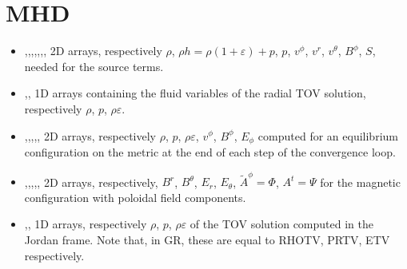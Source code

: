\documentclass[letterpaper,10pt,english]{sphinxmanual}
\begin{document}
\section{MHD}
\label{\detokenize{arrays:mhd}}\begin{itemize}
\item {} 
\sphinxAtStartPar
{},,,,,,, \sphinxhyphen{} 2D arrays, respectively \(\rho\), \(\rho h = \rho (1 + \varepsilon) + p\), \(p\), \(v^\phi\), \(v^r\), \(v^\theta\), \(B^\phi\), \(S\), needed for the source terms.


\item {} 
\sphinxAtStartPar
{},, \sphinxhyphen{} 1D arrays containing the fluid variables of the radial TOV solution, respectively
\(\rho\), \(p\), \(\rho \varepsilon\).


\item {} 
\sphinxAtStartPar
{},,,,, \sphinxhyphen{} 2D arrays, respectively \(\rho\), \(p\), \(\rho \varepsilon\), \(v^\phi\), \(B^\phi\), \(E_\phi\) computed for an equilibrium configuration on the metric at the end of each step of the convergence loop.


\item {} 
\sphinxAtStartPar
{},,,,, \sphinxhyphen{} 2D arrays, respectively, \(B^r\), \(B^\theta\), \(E_r\), \(E_\theta\), \(\tilde A ^\phi = \Phi\), \(A^t = \Psi\) for the magnetic configuration with poloidal field components.


\item {} 
\sphinxAtStartPar
{},, \sphinxhyphen{} 1D arrays, respectively \(\rho\), \(p\), \(\rho \varepsilon\) of the TOV solution computed in the Jordan frame. Note that, in GR, these are equal to RHOTV, PRTV, ETV respectively.

\end{itemize}
\end{document}
